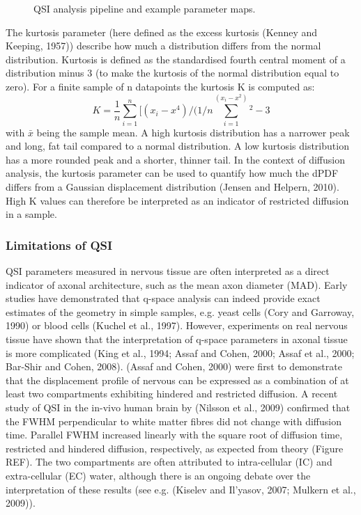 \begin{figure}
 \centering
 \caption{QSI analysis pipeline and example parameter maps.}
 \label{fig:chapter 2 QSI analysis}
\end{figure}


The kurtosis parameter (here defined as the excess kurtosis (Kenney and Keeping, 1957))  describe how much a distribution differs from the normal distribution. Kurtosis is defined as the standardised fourth central moment of a distribution minus 3 (to make the kurtosis of the normal distribution equal to zero). For a finite sample of n datapoints the kurtosis K is computed as:
\begin{equation}
	K=\frac{1}{n} \sum_{i=1}^{n} [(x_i-x^4)/(1/n ∑_{i=1}^(x_i-x^2)^2-3
\end{equation}
with $\bar{x}$ being the sample mean. A high kurtosis distribution has a narrower peak and long, fat tail compared to a normal distribution. A low kurtosis distribution has a more rounded peak and a shorter, thinner tail. In the context of diffusion analysis, the kurtosis parameter can be used to quantify how much the dPDF differs from a Gaussian displacement distribution (Jensen and Helpern, 2010). High K values can therefore be interpreted as an indicator of restricted diffusion in a sample.

\subsubsection*{Limitations of QSI}
QSI parameters measured in nervous tissue are often interpreted as a direct indicator of axonal architecture, such as the mean axon diameter (MAD).  Early studies have demonstrated that q-space analysis can indeed provide exact estimates of the geometry in simple samples, e.g. yeast cells (Cory and Garroway, 1990) or blood cells (Kuchel et al., 1997). However, experiments on real nervous tissue have shown that the interpretation of q-space parameters in axonal tissue is more complicated (King et al., 1994; Assaf and Cohen, 2000; Assaf et al., 2000; Bar-Shir and Cohen, 2008). (Assaf and Cohen, 2000) were first to demonstrate that the displacement profile of nervous can be expressed as a combination of at least two compartments exhibiting hindered and restricted diffusion. A recent study of QSI in the in-vivo human brain by (Nilsson et al., 2009) confirmed that the FWHM perpendicular to white matter fibres did not change with diffusion time. Parallel FWHM increased linearly with the square root of diffusion time, restricted and hindered diffusion, respectively, as expected from theory (Figure REF). The two compartments are often attributed to intra-cellular (IC) and extra-cellular (EC) water, although there is an ongoing debate over the interpretation of these results (see e.g. (Kiselev and Il'yasov, 2007; Mulkern et al., 2009)).


